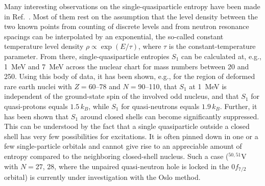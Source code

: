 \documentclass[sort&compress,final,numberedheadings]{aipproc}
\begin{document}
Many interesting observations on the single-quasiparticle entropy have been 
made in Ref.\ \cite{GH01}. Most of them rest on the assumption that the level 
density between the two known points from counting of discrete levels and from
neutron resonance spacings can be interpolated by an exponential, the so-called
constant temperature level density $\rho\propto\exp(E/\tau)$, where $\tau$ is 
the constant-temperature parameter. From there, single-quasiparticle entropies
$S_1$ can be calculated at, e.g., 1~MeV and 7~MeV across the nuclear chart for 
mass numbers between 20 and 250. Using this body of data, it has been shown, 
e.g., for the region of deformed rare earth nuclei with $Z=$60--78 and 
$N=$90--110, that $S_1$ at 1~MeV is independent of the ground-state spin of the
involved odd nucleus, and that $S_1$ for quasi-protons equals $1.5\,k_B$, while
$S_1$ for quasi-neutrons equals $1.9\,k_B$. Further, it has been shown that 
$S_1$ around closed shells can become significantly suppressed. This can be 
understood by the fact that a single quasiparticle outside a closed shell has 
very few possibilities for excitations. It is often pinned down in one or a few
single-particle orbitals and cannot give rise to an appreciable amount of 
entropy compared to the neighboring closed-shell nucleus. Such a case 
($^{50,51}$V with $N=$27, 28, where the unpaired quasi-neutron hole is locked 
in the $0f_{7/2}$ orbital) is currently under investigation with the Oslo 
method. 
\end{document}
